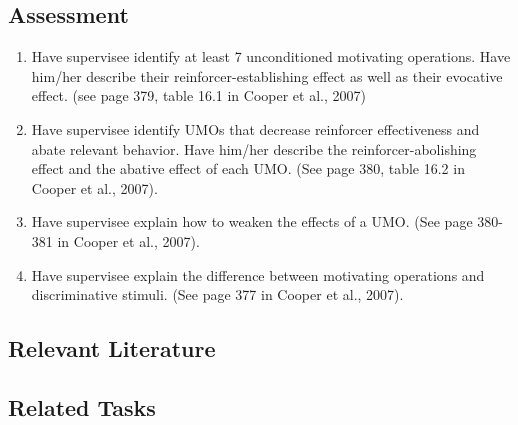 \subsection{Assessment}
\begin{enumerate}
\item Have supervisee identify at least 7 unconditioned motivating operations. Have him/her describe their reinforcer-establishing effect as well as their evocative effect. (see page 379, table 16.1 in Cooper et al., 2007)
\item Have supervisee identify UMOs that decrease reinforcer effectiveness and abate relevant behavior. Have him/her describe the reinforcer-abolishing effect and the abative effect of each UMO. (See page 380, table 16.2 in Cooper et al., 2007).
\item Have supervisee explain how to weaken the effects of a UMO. (See page 380-381 in Cooper et al., 2007).
\item Have supervisee explain the difference between motivating operations and discriminative stimuli. (See page 377 in Cooper et al., 2007).
%
\end{enumerate}
%
\subsection{Relevant Literature}
\begin{refsection}
\nocite{cooper2007applied,
        laraway2001abative,
        lotfizadeh2012motivating,
        michael1982distinguishing,
        michael2000implications,
        ulrich1962reflexive}
\printbibliography[heading=none]
\end{refsection}
%
\subsection{Related Tasks}
\fourdOne{}\\
\foureOne{}\\
\fouriTwo{}\\
\fourFKTwo{}\\
\fourFKThirteen{}\\
\fourFKFourteen{}\\
\fourFKSeventeen{}\\
\fourFKNineteen{}\\
\fourFKTwentySeven{}\\
\fourFKTwentyEight{}\\
\fourFKTwentyNine{}\\
\fourFKThirty{}\\
